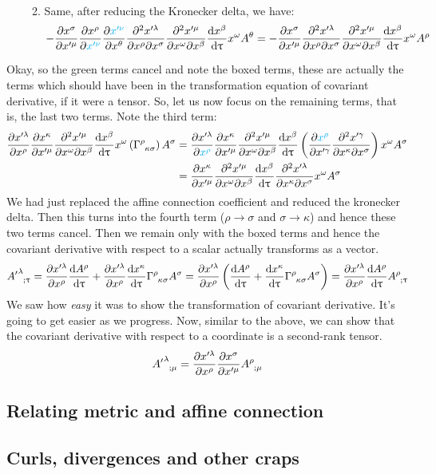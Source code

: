 \begin{itemize}
\begin{enumerate}
\begin{align*}
        \end{align*}
        \item Same, after reducing the Kronecker delta, we have: \begin{align*}
           - \pdv{x^\sigma}{x'^\mu} \pdv{x^\rho}{\mathcolor{cyan}{x'^\nu}} \pdv{\mathcolor{cyan}{x'^\nu}}{x^\theta} \pdv{x'^\lambda}{x^\rho}{x^\sigma}\pdv{x'^\mu}{x^\omega}{x^\beta} \dv{x^\beta}{\uptau} x^\omega  A^\theta = -\pdv{x^\sigma}{x'^\mu}  \pdv{x'^\lambda}{x^\rho}{x^\sigma}\pdv{x'^\mu}{x^\omega}{x^\beta} \dv{x^\beta}{\uptau} x^\omega  A^\rho
        \end{align*}
    \end{enumerate}
\end{itemize}
Okay, so the green terms cancel and note the boxed terms, these are actually the terms which should have been in the transformation equation of covariant derivative, if it were a tensor. So, let us now focus on the remaining terms, that is, the last two terms. Note the third term:
\begin{align*}
    \pdv{x'^\lambda}{x^\rho} \pdv{x^\kappa}{x'^\mu} \pdv{x'^\mu}{x^\omega}{x^\beta} \dv{x^\beta}{\uptau} x^\omega \brac{\tensor{\Gamma}{^\rho_\kappa _\sigma}} A^\sigma &= \pdv{x'^\lambda}{\mathcolor{cyan}{x^\rho}} \pdv{x^\kappa}{x'^\mu} \pdv{x'^\mu}{x^\omega}{x^\beta} \dv{x^\beta}{\uptau} \brac{\pdv{\mathcolor{cyan}{x^\rho}}{x'^\gamma}\pdv{x'^\gamma}{x^\kappa}{x^\sigma}}x^\omega A^\sigma \\
    &= \pdv{x^\kappa}{x'^\mu} \pdv{x'^\mu}{x^\omega}{x^\beta} \dv{x^\beta}{\uptau} \pdv{x'^\lambda}{x^\kappa}{x^\sigma}x^\omega A^\sigma
\end{align*}
We had just replaced the affine connection coefficient and reduced the kronecker delta. Then this turns into the fourth term ($\rho \rightarrow \sigma$ and $\sigma \rightarrow \kappa$) and hence these two terms cancel. Then we remain only with the boxed terms and hence the covariant derivative with respect to a scalar actually transforms as a vector. 
$$\tensor{{A'}}{^\lambda _{;\uptau}} = \pdv{x'^\lambda}{x^\rho} \dv{A^\rho}{\uptau} +\pdv{x'^\lambda}{x^\rho}\dv{x^\kappa}{\uptau}\tensor{\Gamma}{^\rho _\kappa _\sigma}A^\sigma =  \pdv{x'^\lambda}{x^\rho}\brac{\dv{A^\rho}{\uptau}+\dv{x^\kappa}{\uptau}\tensor{\Gamma}{^\rho _\kappa _\sigma}A^\sigma} = \pdv{x'^\lambda}{x^\rho} \dv{A^\rho}{\uptau}\tensor{A}{^\rho _; _\uptau}$$
We saw how \textit{easy} it was to show the transformation of covariant derivative. It's going to get easier as we progress. Now, similar to the above, we can show that the covariant derivative with respect to a coordinate is a second-rank tensor. 
$$\tensor{{A'}}{^\lambda _{;\mu}} =\pdv{x'^\lambda}{x^\rho} \pdv{x^\sigma}{x'^\mu}\tensor{A}{^\rho _; _\mu}$$
\subsection{Relating metric and affine connection}

\subsection{Curls, divergences and other craps}